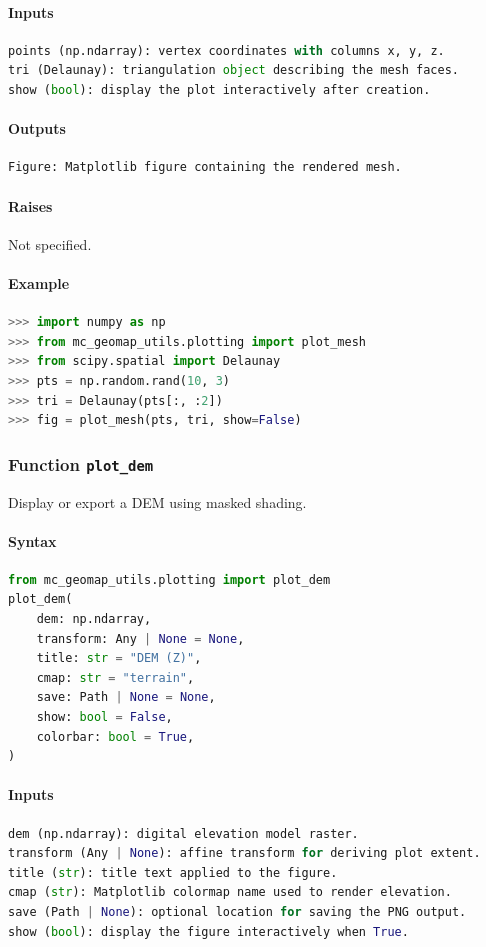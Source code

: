 \documentclass[11pt]{article}
\begin{document}
\paragraph{Inputs}
\begin{lstlisting}[language=Python]
points (np.ndarray): vertex coordinates with columns x, y, z.
tri (Delaunay): triangulation object describing the mesh faces.
show (bool): display the plot interactively after creation.
\end{lstlisting}
\paragraph{Outputs}
\begin{lstlisting}[language=Python]
Figure: Matplotlib figure containing the rendered mesh.
\end{lstlisting}
\paragraph{Raises}
Not specified.
\paragraph{Example}
\begin{lstlisting}[language=Python]
>>> import numpy as np
>>> from mc_geomap_utils.plotting import plot_mesh
>>> from scipy.spatial import Delaunay
>>> pts = np.random.rand(10, 3)
>>> tri = Delaunay(pts[:, :2])
>>> fig = plot_mesh(pts, tri, show=False)
\end{lstlisting}

\subsubsection{Function \texttt{plot\_dem}}
Display or export a DEM using masked shading.

\paragraph{Syntax}
\begin{lstlisting}[language=Python]
from mc_geomap_utils.plotting import plot_dem
plot_dem(
    dem: np.ndarray,
    transform: Any | None = None,
    title: str = "DEM (Z)",
    cmap: str = "terrain",
    save: Path | None = None,
    show: bool = False,
    colorbar: bool = True,
)
\end{lstlisting}
\paragraph{Inputs}
\begin{lstlisting}[language=Python]
dem (np.ndarray): digital elevation model raster.
transform (Any | None): affine transform for deriving plot extent.
title (str): title text applied to the figure.
cmap (str): Matplotlib colormap name used to render elevation.
save (Path | None): optional location for saving the PNG output.
show (bool): display the figure interactively when True.
\end{lstlisting}
\end{document}
